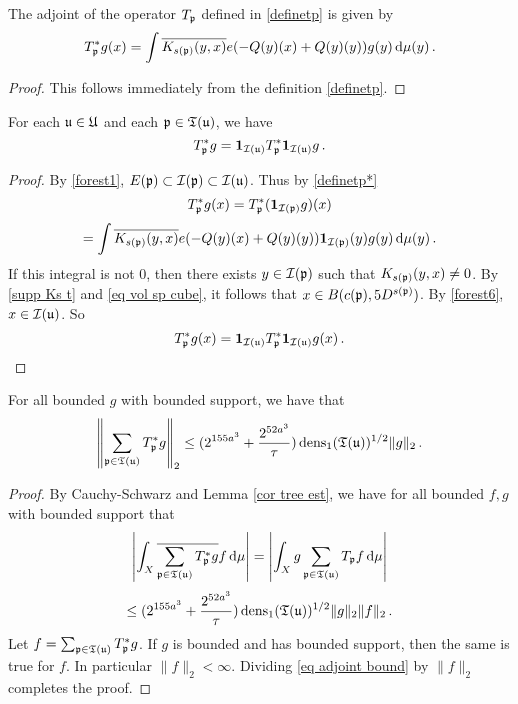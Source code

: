 \begin{lemma}
    The adjoint of the operator $T_{\mathfrak p}$ defined in \eqref{definetp} is given by
    \begin{equation}
        \label{definetp*}
        T_{\mathfrak p}^* g(x) = \int \overline{K_{s(\mathfrak p)}(y,x)} e(-Q(y)(x)+ Q(y)(y)) g(y) \, \mathrm{d}\mu(y)\,.
        \end{equation}
\end{lemma}

\begin{proof}
    This follows immediately from the definition \eqref{definetp}.
\end{proof}

\begin{lemma}
    \label{lem Tp support adjoint}
    For each $\mathfrak u \in \mathfrak U$ and each $\mathfrak p \in \mathfrak T(\mathfrak u)$, we have
    $$
        T_{\mathfrak p}^* g = \mathbf{1}_{\mathcal{I}(\mathfrak u)} T_{\mathfrak p}^* \mathbf{1}_{\mathcal{I}(\mathfrak u)} g\,.
    $$
\end{lemma}

\begin{proof}
    By \eqref{forest1}, $E(\mathfrak p) \subset \mathcal{I}(\mathfrak p) \subset \mathcal{I}(\mathfrak u)$. Thus by \eqref{definetp*}
    $$
            T_{\mathfrak p}^* g(x) =  T_{\mathfrak p}^* (\mathbf{1}_{\mathcal{I}(\mathfrak p)} g)(x)
    $$
    $$
        = \int \overline{K_{s(\mathfrak p)}(y,x)} e(-Q(y)(x) +  Q(y)(y)) \mathbf{1}_{\mathcal{I}(\mathfrak p)}(y) g(y) \, \mathrm{d}\mu(y)\,.
    $$
    If this integral is not $0$, then there exists $y \in \mathcal{I}(\mathfrak p)$ such that $K_{s(\mathfrak p)}(y,x) \ne 0$. By \eqref{supp Ks t} and \eqref{eq vol sp cube}, it follows that $x \in B(c(\mathfrak p), 5 D^{s(\mathfrak p)})$. By \eqref{forest6}, $x \in \mathcal{I}(\mathfrak u)$. So
    $$
        T_{\mathfrak p}^* g(x) = \mathbf{1}_{\mathcal{I}(\mathfrak u)} T_{\mathfrak p}^* \mathbf{1}_{\mathcal{I}(\mathfrak u)} g(x)\,.
    $$
\end{proof}

\begin{lemma}
    \label{lem tree adjoint bound}
    For all bounded $g$ with bounded support, we have that
    $$
        \left\| \sum_{\mathfrak p \in \mathfrak T(\mathfrak u)} T_{\mathfrak p}^* g\right\|_2 \le (2^{155a^3} + \frac{2^{52a^3}}{\tau}) \operatorname{\operatorname{dens}}_1(\mathfrak T(\mathfrak u))^{1/2} \|g\|_2\,.
    $$
\end{lemma}

\begin{proof}
    By Cauchy-Schwarz and Lemma \ref{cor tree est}, we have for all bounded $f,g$ with bounded support that
    $$
        \left| \int_X \overline{\sum_{\mathfrak p\in \mathfrak T(\mathfrak u)} T_{\mathfrak p}^* g} f \,\mathrm{d}\mu \right| = \left| \int_X g \sum_{\mathfrak p \in \mathfrak T(\mathfrak u)} T_{\mathfrak p} f \,\mathrm{d}\mu \right|
    $$
    \begin{equation}
        \label{eq adjoint bound}
        \le (2^{155a^3} + \frac{2^{52a^3}}{\tau}) \operatorname{\operatorname{dens}}_1(\mathfrak T(\mathfrak u))^{1/2} \|g\|_2 \|f\|_2\,.
    \end{equation}
    Let $f = \sum_{\mathfrak p \in \mathfrak T(\mathfrak u)} T_{\mathfrak p}^* g$. If $g$ is bounded and has bounded support, then the same is true for $f$. In particular $\|f\|_2 < \infty$. Dividing \eqref{eq adjoint bound} by $\|f\|_2$ completes the proof.
\end{proof}

